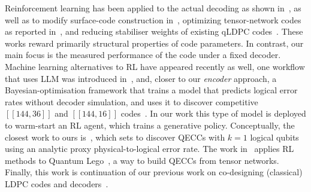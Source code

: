 \noindent Reinforcement learning has been applied to the actual decoding as shown in~\cite{sweke2020reinforcement, blue2026machine}, as well as
to modify surface-code construction in~\cite{nautrup2019optimizing}, 
optimizing tensor-network codes as reported in~\cite{mauron2024optimization}, 
and reducing stabiliser weights of existing qLDPC codes~\cite{he2025discovering}. 
These works reward primarily structural properties of code parameters. 
In contrast, our main focus is the measured performance of the code under a fixed decoder.
Machine learning alternatives to RL have appeared recently as well, one workflow that uses LLM was introduced in~\cite{cruzbenito2026evolutionary}, and, closer to our \emph{encoder} approach, 
a Bayesian-optimisation framework that trains a model that predicts logical error rates without decoder simulation, 
and uses it to discover competitive \([[144,36]]\) and \([[144,16]]\) codes~\cite{cheng2026bayesian}. 
In our work this type of model is deployed to warm-start an RL agent, which trains a generative policy. 
Conceptually, the closest work to ours is~\cite{su2305discovery}, which sets to discover QECCs with \(k=1\) logical qubits using an analytic proxy physical-to-logical error rate. 
The work in~\cite{su2305discovery} applies RL methods to Quantum Lego~\cite{cao2022quantum}, a way to build QECCs from tensor networks.
Finally, this work is continuation of our previous work on co-designing (classical) LDPC codes and decoders~\cite{sella2024coding}. 